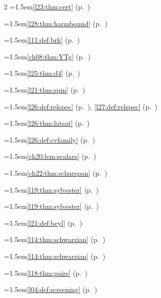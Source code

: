 \begin{multicols}{2}
\hangindent=1.5em\quad \ref{l23:thm:cert} (p.~\pageref{l23:thm:cert})\par
\hangindent=1.5em\quad \ref{l28:thm:harmbound} (p.~\pageref{l28:thm:harmbound})\par
\hangindent=1.5em\quad \ref{l11:def:brk} (p.~\pageref{l11:def:brk})\par
\hangindent=1.5em\quad \ref{ch08:thm:YTg} (p.~\pageref{ch08:thm:YTg})\par
\par{}\par\nopagebreak\smallskip
\hangindent=1.5em\quad \ref{l25:thm:d4} (p.~\pageref{l25:thm:d4})\par
\hangindent=1.5em\quad \ref{l21:thm:spin} (p.~\pageref{l21:thm:spin})\par
\hangindent=1.5em\quad \ref{l26:def:relspec} (p.~\pageref{l26:def:relspec}), \ref{l27:def:relspec} (p.~\pageref{l27:def:relspec})\par
\hangindent=1.5em\quad \ref{l26:thm:latsat} (p.~\pageref{l26:thm:latsat})\par
\hangindent=1.5em\quad \ref{l26:def:cvfamily} (p.~\pageref{l26:def:cvfamily})\par
\hangindent=1.5em\quad \ref{ch20:lem:scalars} (p.~\pageref{ch20:lem:scalars})\par
\hangindent=1.5em\quad \ref{ch22:thm:schurspan} (p.~\pageref{ch22:thm:schurspan})\par
\hangindent=1.5em\quad \ref{l19:thm:sylvester} (p.~\pageref{l19:thm:sylvester})\par
\hangindent=1.5em\quad \ref{l19:thm:sylvester} (p.~\pageref{l19:thm:sylvester})\par
\hangindent=1.5em\quad \ref{l21:def:beyl} (p.~\pageref{l21:def:beyl})\par
\hangindent=1.5em\quad \ref{l14:thm:schwarzian} (p.~\pageref{l14:thm:schwarzian})\par
\hangindent=1.5em\quad \ref{l14:thm:schwarzian} (p.~\pageref{l14:thm:schwarzian})\par
\hangindent=1.5em\quad \ref{l18:thm:pairs} (p.~\pageref{l18:thm:pairs})\par
\hangindent=1.5em\quad \ref{l04:def:screening} (p.~\pageref{l04:def:screening})\par

\end{multicols}
